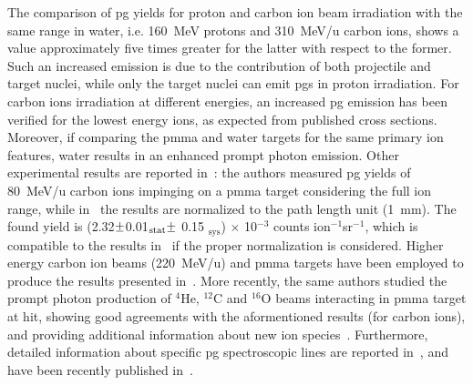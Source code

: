 \begin{table}[!htbp]
\centering
\caption{Absolute \gls{pg} yields measured in the first point after the \gls{pg} profile entrance rise. The energy range shows the energy range of the primary particles inside the \gls{fov} of the measurement point estimated in simulation. Table reproduced from~\cite{Pinto2015}.}
\label{chap2::tab::PG_yields_tab}
\end{table}    

The comparison of \gls{pg} yields for proton and carbon ion beam irradiation with the same range in water, i.e. 160~MeV protons and 310~MeV/u carbon ions, shows a value approximately five times greater for the latter with respect to the former. Such an increased emission is due to the contribution of both projectile and target nuclei, while only the target nuclei can emit \glspl{pg} in proton irradiation. For carbon ions irradiation at different energies, an increased \gls{pg} emission has been verified for the lowest energy ions, as expected from published cross sections. Moreover, if comparing the \gls{pmma} and water targets for the same primary ion features, water results in an enhanced prompt photon emission. 
Other experimental results are reported in~\cite{Agodi2012, Agodi2013}: the authors measured \gls{pg} yields of 80~MeV/u carbon ions impinging on a \gls{pmma} target considering the full ion range, while in~\cite{Pinto2015} the results are normalized to the path length unit (1~mm). The found yield is (2.32$\varpm$0.01$_{\mathrm{stat}} \varpm$ 0.15 $_{\mathrm{sys}}$) $\times$ 10$^{-3}$ counts ion$^{-1}$sr$^{-1}$, which is compatible to the results in~\cite{Pinto2015} if the proper normalization is considered. Higher energy carbon ion beams (220~MeV/u) and \gls{pmma} targets have been employed to produce the results presented in~\cite{Mattei2015}. More recently, the same authors studied the prompt photon production of $^{4}$He, $^{12}$C and $^{16}$O beams interacting in \gls{pmma} target at \gls{hit}, showing good agreements with the aformentioned results (for carbon ions), and providing additional information about new ion species~\parencite{Mattei2017}. 
Furthermore, detailed information about specific \gls{pg} spectroscopic lines are reported in~\cite{Verburg2014, Verburg2013}, and have been recently published in~\cite{Kelleter2017}.

